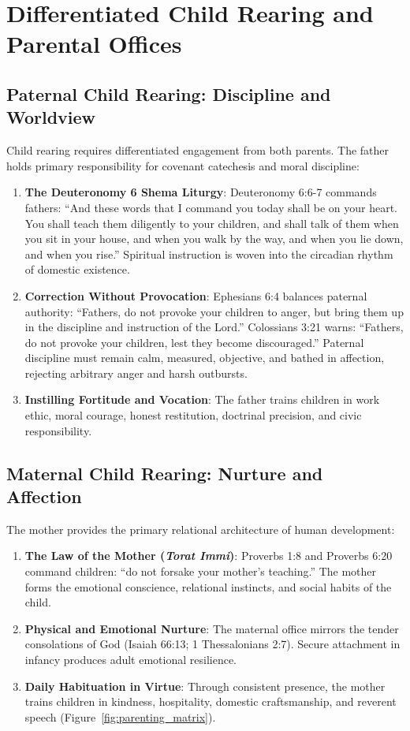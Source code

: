\documentclass[11pt,twocolumn]{article}
\begin{document}
\section{Differentiated Child Rearing and Parental Offices}

\subsection{Paternal Child Rearing: Discipline and Worldview}
Child rearing requires differentiated engagement from both parents. The father holds primary responsibility for covenant catechesis and moral discipline:
\begin{enumerate}
    \item \textbf{The Deuteronomy 6 Shema Liturgy}: Deuteronomy 6:6-7 commands fathers: ``And these words that I command you today shall be on your heart. You shall teach them diligently to your children, and shall talk of them when you sit in your house, and when you walk by the way, and when you lie down, and when you rise.'' Spiritual instruction is woven into the circadian rhythm of domestic existence.
    \item \textbf{Correction Without Provocation}: Ephesians 6:4 balances paternal authority: ``Fathers, do not provoke your children to anger, but bring them up in the discipline and instruction of the Lord.'' Colossians 3:21 warns: ``Fathers, do not provoke your children, lest they become discouraged.'' Paternal discipline must remain calm, measured, objective, and bathed in affection, rejecting arbitrary anger and harsh outbursts.
    \item \textbf{Instilling Fortitude and Vocation}: The father trains children in work ethic, moral courage, honest restitution, doctrinal precision, and civic responsibility.
\end{enumerate}

\subsection{Maternal Child Rearing: Nurture and Affection}
The mother provides the primary relational architecture of human development:
\begin{enumerate}
    \item \textbf{The Law of the Mother (\textit{Torat Immi})}: Proverbs 1:8 and Proverbs 6:20 command children: ``do not forsake your mother's teaching.'' The mother forms the emotional conscience, relational instincts, and social habits of the child.
    \item \textbf{Physical and Emotional Nurture}: The maternal office mirrors the tender consolations of God (Isaiah 66:13; 1 Thessalonians 2:7). Secure attachment in infancy produces adult emotional resilience.
    \item \textbf{Daily Habituation in Virtue}: Through consistent presence, the mother trains children in kindness, hospitality, domestic craftsmanship, and reverent speech (Figure~\ref{fig:parenting_matrix}).
\end{enumerate}
\end{document}
